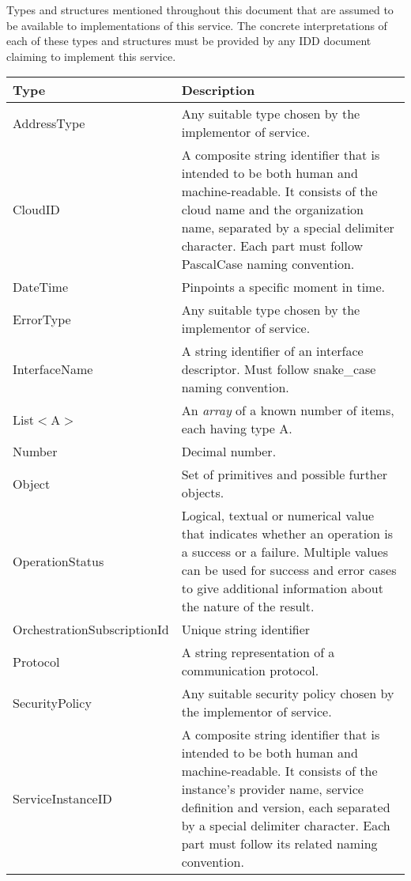 \documentclass[a4paper]{arrowhead}
\newcommand{\pdef}[1]{{\textcolor{ArrowheadGrey}{#1\label{sec:model:primitives:#1}\label{sec:model:primitives:#1s}\label{sec:model:primitives:#1es}}}}
\begin{document}
Types and structures mentioned throughout this document that are assumed to be available to implementations of this service.
The concrete interpretations of each of these types and structures must be provided by any IDD document claiming to implement this service.


\begin{table}[ht!]
\begin{tabularx}{\textwidth}{| p{4.3cm} | X |} \hline
\rowcolor{gray!33} Type & Description \\ \hline
\pdef{AddressType}      & Any suitable type chosen by the implementor of service. \\ \hline
\pdef{CloudID} & A composite string identifier that is intended to be both human and machine-readable. It consists of the cloud name and the organization name, separated by a special delimiter character. Each part must follow PascalCase naming convention. \\ \hline
\pdef{DateTime}         & Pinpoints a specific moment in time. \\ \hline
\pdef{ErrorType}        & Any suitable type chosen by the implementor of service. \\ \hline
\pdef{InterfaceName}& A string identifier of an interface descriptor. Must follow snake\_case naming convention. \\ \hline
\pdef{List}$<$A$>$      & An \textit{array} of a known number of items, each having type A. \\ \hline
\pdef{Number}           & Decimal number. \\ \hline
\pdef{Object}           & Set of primitives and possible further objects. \\ \hline
\pdef{OperationStatus}  & Logical, textual or numerical value that indicates whether an operation is a success or a failure. Multiple values can be used for success and error cases to give additional information about the nature of the result. \\ \hline
\pdef{OrchestrationSubscriptionId} & Unique string identifier \\ \hline
\pdef{Protocol}         & A string representation of a communication protocol. \\ \hline
\pdef{SecurityPolicy}   & Any suitable security policy chosen by the implementor of service. \\ \hline
\pdef{ServiceInstanceID} & A composite string identifier that is intended to be both human and machine-readable. It consists of the instance's provider name, service definition and version, each separated by a special delimiter character. Each part must follow its related naming convention. \\ \hline

\end{tabularx}
\end{table}
\end{document}
